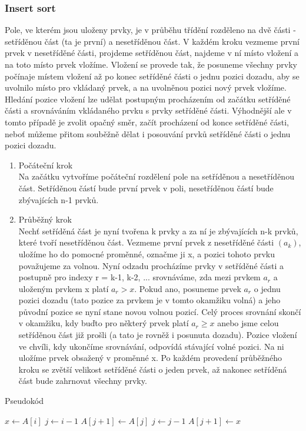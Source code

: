\documentclass[10pt,a4paper]{article}
\begin{document}
\subsubsection{Insert sort}
Pole, ve kterém jsou uloženy prvky, je v průběhu třídění rozděleno na dvě části - setříděnou část (ta je první) a nesetříděnou část. V každém kroku vezmeme první prvek v nesetříděné části, projdeme setříděnou část, najdeme v ní místo vložení a na toto místo prvek vložíme. Vložení se provede tak, že posuneme všechny prvky počínaje místem vložení až po konec setříděné části o jednu pozici dozadu, aby se uvolnilo místo pro vkládaný prvek, a na uvolněnou pozici nový prvek vložíme. Hledání pozice vložení lze udělat postupným procházením od začátku setříděné části a srovnáváním vkládaného prvku s prvky setříděné části. Výhodnější ale v tomto případě je zvolit opačný směr, začít procházení od konce setříděné části, neboť můžeme přitom souběžně dělat i posouvání prvků setříděné části o jednu pozici dozadu.
\begin{enumerate}
	\item Počáteční krok \\
	Na začátku vytvoříme počáteční rozdělení pole na setříděnou a nesetříděnou část. Setříděnou částí bude první prvek v poli, nesetříděnou částí bude zbývajících n-1 prvků.
	\item Průběžný krok \\
	Nechť setříděná část je nyní tvořena k prvky a za ní je zbývajících n-k prvků, které tvoří nesetříděnou část. Vezmeme první prvek z nesetříděné části $(a_k)$, uložíme ho do pomocné proměnné, označme ji x, a pozici tohoto prvku považujeme za volnou. Nyní odzadu procházíme prvky v setříděné části a postupně pro indexy r = k-1, k-2, ... srovnáváme, zda mezi prvkem $a_r$ a uloženým prvkem x platí $a_r > x$. Pokud ano, posuneme prvek $a_r$ o jednu pozici dozadu (tato pozice za prvkem je v tomto okamžiku volná) a jeho původní pozice se nyní stane novou volnou pozicí. Celý proces srovnání skončí v okamžiku, kdy buďto pro některý prvek platí $a_r \geq x$ anebo jsme celou setříděnou část již prošli (a tato je rovněž i posunuta dozadu). Pozice vložení ve chvíli, kdy ukončíme srovnávání, odpovídá stávající volné pozici. Na ni uložíme prvek obsažený v proměnné x. Po každém provedení průběžného kroku se zvětší velikost setříděné části o jeden prvek, až nakonec setříděná část bude zahrnovat všechny prvky.
\end{enumerate}


\begin{algorithm}
\caption{Pseudokód}
\begin{algorithmic}[]
	\State $x \gets A[i]$
	\State $j \gets i-1$
		\State $A[j+1] \gets A[j]$
		\State $j \gets j-1$
	\EndWhile
	\State $A[j+1] \gets x$
\EndFor
\EndProcedure
\end{algorithmic}
\end{algorithm}
\end{document}
